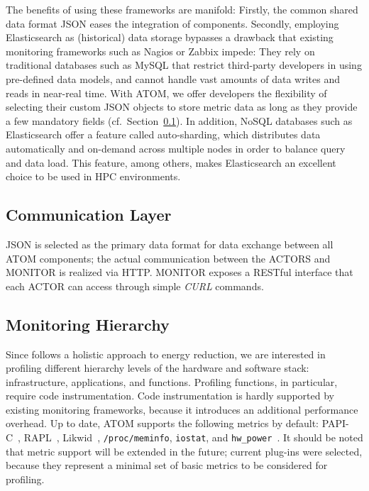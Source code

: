 \documentclass[10pt,letterpaper]{IEEEtran}
\begin{document}
The benefits of using these frameworks are manifold: Firstly, the common shared data format JSON eases the
integration of components. Secondly, employing Elasticsearch as (historical) data storage bypasses a
drawback that existing monitoring frameworks such as Nagios or Zabbix impede: They rely on traditional
databases such as MySQL that restrict third-party developers in using pre-defined data models, and cannot
handle vast amounts of data writes and reads in near-real time. With ATOM, we offer developers the flexibility
of selecting their custom JSON objects to store metric data as long as they provide a few mandatory fields
(cf.~Section~\ref{subsec:communication-layer}). In addition, NoSQL databases such as Elasticsearch offer a
feature called auto-sharding, which distributes data automatically and on-demand across multiple nodes in
order to balance query and data load. This feature, among others, makes Elasticsearch an excellent
choice to be used in HPC environments.

\subsection{Communication Layer}\label{subsec:communication-layer}
JSON is selected as the primary data format for data exchange between all ATOM components; the actual
communication between the ACTORS and MONITOR is realized via HTTP. MONITOR exposes a RESTful interface
that each ACTOR can access through simple \emph{CURL} commands.

\subsection{Monitoring Hierarchy}
Since \EXCESS follows a holistic approach to energy reduction, we are interested in profiling different
hierarchy levels of the hardware and software stack: infrastructure, applications, and functions.
Profiling functions, in particular, require code instrumentation. Code instrumentation is hardly
supported by existing monitoring frameworks, because it introduces an additional performance overhead.
Up to date, ATOM supports the following metrics by default: PAPI-C~\cite{terpstra10}, RAPL~\cite{hahnel12},
Likwid~\cite{treibig12}, \texttt{/proc/meminfo}, \texttt{iostat}, and \texttt{hw\_power}~\cite{khabi14}.
It should be noted that metric support will be extended in the future; current plug-ins were selected,
because they represent a minimal set of basic metrics to be considered for profiling.
\end{document}
